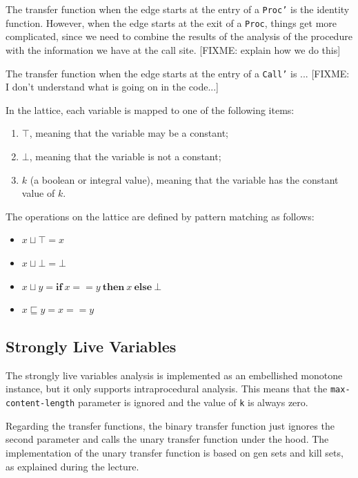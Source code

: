 \documentclass{article}
\begin{document}
The transfer function when the edge starts at the entry of a \texttt{Proc'} is the identity function. However, when the edge starts at the exit of a \texttt{Proc}, things get more complicated, since we need to combine the results of the analysis of the procedure with the information we have at the call site. [FIXME: explain how we do this]

The transfer function when the edge starts at the entry of a \texttt{Call'} is ... [FIXME: I don't understand what is going on in the code...]

In the lattice, each variable is mapped to one of the following items:

\begin{enumerate}
	\item $\top$, meaning that the variable may be a constant;
	\item $\bot$, meaning that the variable is not a constant;
	\item $k$ (a boolean or integral value), meaning that the variable has the constant value of $k$.
\end{enumerate}

The operations on the lattice are defined by pattern matching as follows:

\begin{itemize}
	\item $x \sqcup \top = x$
	\item $x \sqcup \bot = \bot$
	\item $x \sqcup y = \mathbf{if}\ x == y\ \mathbf{then}\ x\ \mathbf{else}\ \bot$
	\item $x \sqsubseteq y = x == y$
\end{itemize}

\subsection*{Strongly Live Variables}

The strongly live variables analysis is implemented as an embellished monotone instance, but it only supports intraprocedural analysis. This means that the \texttt{max-content-length} parameter is ignored and the value of \texttt{k} is always zero.

Regarding the transfer functions, the binary transfer function just ignores the second parameter and calls the unary transfer function under the hood. The implementation of the unary transfer function is based on gen sets and kill sets, as explained during the lecture.
\end{document}
